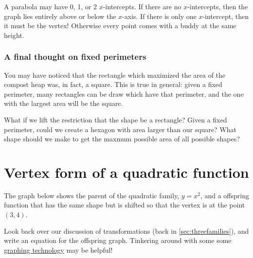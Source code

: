 A parabola may have 0, 1, or 2 $x$-intercepts. If there are no $x$-intercepts, then the graph lies entirely above or below the $x$-axis. If there is only one $x$-intercept, then it must be the vertex! Otherwise every point comes with a buddy at the same height.


\subsubsection{A final thought on fixed perimeters}

You may have noticed that the rectangle which maximized the area of the compost heap was, in fact, a square. This is true in general: given a fixed perimeter, many rectangles can be draw which have that perimeter, and the one with the largest area will be the square.

What if we lift the restriction that the shape be a rectangle? Given a fixed perimeter, could we create a hexagon with area larger than our square? What shape should we make to get the maxmum possible area of all possible shapes?


\section{Vertex form of a quadratic function}
\label{sec:vertexform}

\begin{boxedexplore}
The graph below shows the parent of the quadratic family, $y=x^2$, and a offspring function that has the same shape but is shifted so that the vertex is at the point $(3, 4)$.

\begin{center}
\end{center}

Look back over our discussion of transformations (back in \cref{sec:threefamilies}), and write an equation for the offspring graph. Tinkering around with some some \href{https://www.desmos.com/}{graphing technology} may be helpful!
\end{boxedexplore}

